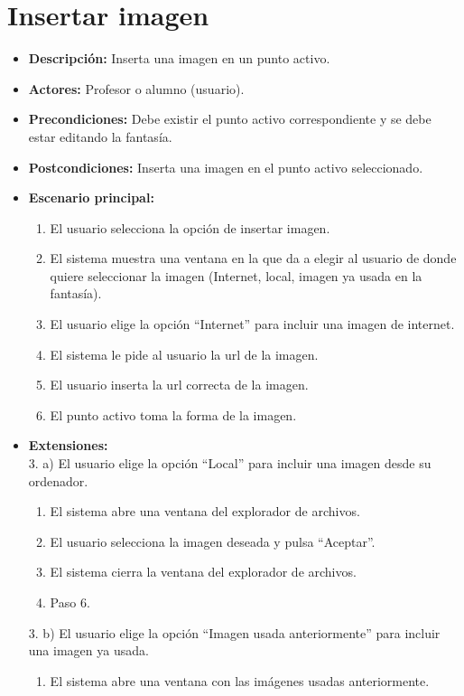 \documentclass[12pt,letterpaper]{article}
\begin{document}
\section{Insertar imagen} %
\begin{itemize}
	\item \textbf{Descripción:} Inserta una imagen en un punto activo.
	\item \textbf{Actores:} Profesor o alumno (usuario).
	\item \textbf{Precondiciones:} Debe existir el punto activo correspondiente y se debe estar editando la fantasía.
	\item \textbf{Postcondiciones:} Inserta una imagen en el punto activo seleccionado.
	\item \textbf{Escenario principal:}
	\begin{enumerate}
		\item El usuario selecciona la opción de insertar imagen.
		\item El sistema muestra una ventana en la que da a elegir al usuario de donde quiere seleccionar la imagen (Internet, local, imagen ya usada en la fantasía).
		\item El usuario elige la opción ``Internet'' para incluir una imagen de internet.
		\item El sistema le pide al usuario la url de la imagen.
		\item El usuario inserta la url correcta de la imagen.
		\item El punto activo toma la forma de la imagen.
	\end{enumerate}
	\item \textbf{Extensiones:} \\3. a) El usuario elige la opción ``Local'' para incluir una imagen desde su ordenador.
	\begin{enumerate}
		\item El sistema abre una ventana del explorador de archivos.
		\item El usuario selecciona la imagen deseada y pulsa ``Aceptar''.
		\item El sistema cierra la ventana del explorador de archivos.
		\item Paso 6.
	\end{enumerate}
	3. b) El usuario elige la opción ``Imagen usada anteriormente'' para incluir una imagen ya usada.
	\begin{enumerate}
		\item El sistema abre una ventana con las imágenes usadas anteriormente.

\end{enumerate}
\end{itemize}
\end{document}
